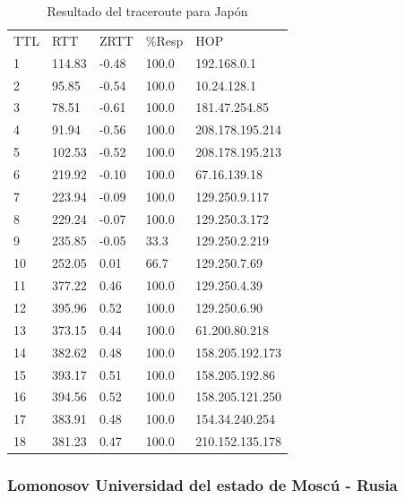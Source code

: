 \begin{table}[H]
    \begin{tabular}{lllll}
    TTL & RTT    & ZRTT  & \%Resp & HOP             \\
    1   & 114.83 & -0.48 & 100.0  & 192.168.0.1     \\
    2   & 95.85  & -0.54 & 100.0  & 10.24.128.1     \\
    3   & 78.51  & -0.61 & 100.0  & 181.47.254.85   \\
    4   & 91.94  & -0.56 & 100.0  & 208.178.195.214 \\
    5   & 102.53 & -0.52 & 100.0  & 208.178.195.213 \\
    6   & 219.92 & -0.10 & 100.0  & 67.16.139.18    \\
    7   & 223.94 & -0.09 & 100.0  & 129.250.9.117   \\
    8   & 229.24 & -0.07 & 100.0  & 129.250.3.172   \\
    9   & 235.85 & -0.05 & 33.3   & 129.250.2.219   \\
    10  & 252.05 & 0.01  & 66.7   & 129.250.7.69    \\
    11  & 377.22 & 0.46  & 100.0  & 129.250.4.39    \\
    12  & 395.96 & 0.52  & 100.0  & 129.250.6.90    \\
    13  & 373.15 & 0.44  & 100.0  & 61.200.80.218   \\
    14  & 382.62 & 0.48  & 100.0  & 158.205.192.173 \\
    15  & 393.17 & 0.51  & 100.0  & 158.205.192.86  \\
    16  & 394.56 & 0.52  & 100.0  & 158.205.121.250 \\
    17  & 383.91 & 0.48  & 100.0  & 154.34.240.254  \\
    18  & 381.23 & 0.47  & 100.0  & 210.152.135.178 \\
    \end{tabular}
    \caption{Resultado del traceroute para Japón}
  \label{fig:tabla-tok}
\end{table}

\subsubsection{Lomonosov Universidad del estado de Moscú - Rusia}

